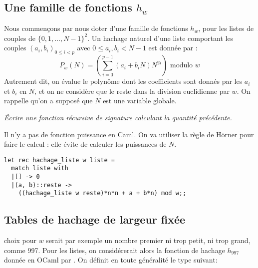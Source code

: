 \subsection{Une famille de fonctions $h_w$}
Nous commençons par nous doter d’une famille de fonctions $h_w$, pour les listes
de couples de $\{0, 1, \ldots, N-1\}^2$. Un hachage naturel d’une liste comportant
les couples $(a_i, b_i)_{0 \leq i < p}$ avec $0 \leq a_i, b_i < N-1$ est
donnée par :
\[
P_w(N)=\left(\sum_{i=0}^{p-1}(a_i+b_iN)N^{2i}\right) \text{ modulo } w
\]
Autrement dit, on évalue le polynôme dont les coefficients sont donnés
par les $a_i$ et $b_i$ en $N$, et on ne considère que le reste dans la
division euclidienne par $w$. On rappelle qu’on a supposé que $N$ est
une variable globale.
\begin{Exercise}\it
Écrire une fonction récursive  de signature
 calculant la quantité précédente.
\end{Exercise}
\begin{Answer}
Il n'y a pas de fonction puissance en Caml. On va utiliser la règle de Hörner pour faire le calcul : elle évite de calculer les puissances de $N$.
\begin{lstlisting}
let rec hachage_liste w liste = 
  match liste with
  |[] -> 0
  |(a, b)::reste -> 
    ((hachage_liste w reste)*n*n + a + b*n) mod w;;  
\end{lstlisting}
\end{Answer}
\newpage
\subsection{Tables de hachage de largeur fixée}
choix pour $w$ serait par exemple un nombre premier ni trop petit, ni
trop grand, comme 997. Pour les listes, on considérerait alors la
fonction de hachage $h_{997}$ donnée en OCaml par
. On définit en toute généralité le type suivant:

